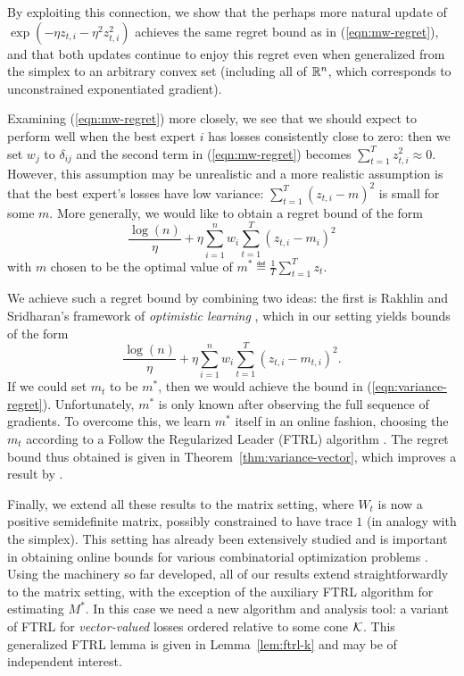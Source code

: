 \documentclass[paper_icml.tex]{subfiles}
\begin{document}
By exploiting this connection, we show that the perhaps more natural update 
of $\exp(-\eta z_{t,i} - \eta^2 z_{t,i}^2)$ achieves the same regret bound 
as in (\ref{eqn:mw-regret}), and that both updates continue to enjoy this 
regret even when generalized from the simplex to an arbitrary convex set 
(including all of $\mathbb{R}^n$, which corresponds to unconstrained exponentiated 
gradient). 

Examining (\ref{eqn:mw-regret}) more closely, we see that we should expect 
to perform well when the best expert $i$ has losses consistently close to zero: 
then we set $w_j$ to $\delta_{ij}$ and the second term in (\ref{eqn:mw-regret}) 
becomes $\sum_{t=1}^T z_{t,i}^2 \approx 0$. However, this assumption may be 
unrealistic and a more realistic assumption is that the best expert's losses 
have low variance: $\sum_{t=1}^T (z_{t,i} - m)^2$ is small for some $m$. More 
generally, we would like to obtain a regret bound of the form
\begin{equation}
\label{eqn:variance-regret}
\frac{\log(n)}{\eta} + \eta \sum_{i=1}^n w_i \sum_{t=1}^T (z_{t,i}-m_i)^2
\end{equation}
with $m$ chosen to be the optimal value of 
$m^* \eqdef \frac{1}{T} \sum_{t=1}^T z_t$.

We achieve such a regret bound by combining two ideas: the first is 
Rakhlin and Sridharan's framework of \emph{optimistic learning} 
\cite{rakhlin2012}, which in our setting yields bounds of the form 
\begin{equation}
\label{eqn:optimistic-regret}
\frac{\log(n)}{\eta} + \eta \sum_{i=1}^n w_i \sum_{t=1}^T (z_{t,i} - m_{t,i})^2.
\end{equation}
If we could set $m_t$ to be $m^*$, then we would achieve the bound in 
(\ref{eqn:variance-regret}). Unfortunately, $m^*$ is only known after observing 
the full sequence of gradients. To overcome this, we learn $m^*$ itself in an 
online fashion, choosing the $m_t$ according to a Follow the Regularized Leader 
(FTRL) algorithm \cite{ftrl}. The regret bound thus obtained is given in 
Theorem~\ref{thm:variance-vector}, which improves a result by 
\cite{hazan2010variation}.

Finally, we extend all these results to the matrix setting, where $W_t$ is now 
a positive semidefinite matrix, possibly constrained to have trace $1$ 
(in analogy with the simplex). This setting has already been extensively studied 
\cite{lotsofpeople} and is important in obtaining online bounds for various 
combinatorial optimization problems \cite{morepeople}. Using the machinery so 
far developed, all of our results extend straightforwardly to the matrix setting, 
with the exception of the auxiliary FTRL algorithm for estimating $M^*$. In this 
case we need a new algorithm and analysis tool: a variant of FTRL for 
\emph{vector-valued} losses ordered relative to some cone $\mathcal{K}$. This generalized 
FTRL lemma is given in Lemma~\ref{lem:ftrl-k} and may be of independent interest.
\end{document}
